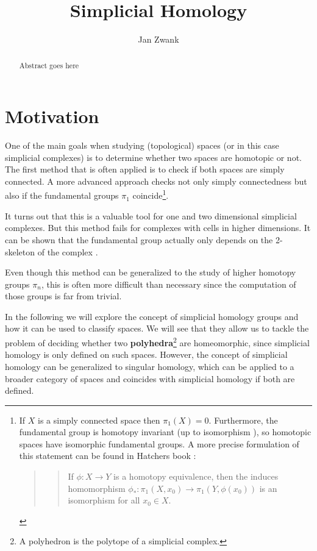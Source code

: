 \documentclass[draft]{scrartcl}
\title{Simplicial Homology}
\author{Jan Zwank}
\theoremstyle{plain}
\theoremstyle{definition}
\theoremstyle{remark}
\newcommand{\sh}{simplicial homology}
\newcommand{\scs}{simplicial complexes}
\begin{document}
	\maketitle
	
	\begin{abstract}
		Abstract goes here
	\end{abstract}
\tableofcontents

\clearpage

\section{Motivation}
One of the main goals when studying (topological) spaces (or in this case \scs) is to determine whether two spaces are homotopic
 or not. The first method that is often applied is to check if both spaces are simply connected. A more advanced approach checks not only simply connectedness but also if the fundamental groups $\pi_1$ coincide\footnote{If $X$ is a simply connected space then $\pi_1(X)=0$. Furthermore, the fundamental group is homotopy invariant (up to isomorphism 
	), so homotopic spaces have isomorphic fundamental groups. A more precise formulation of this statement can be found in Hatchers book \parencite[Prop. 1.18, p. 37]{ha}:
\begin{quotation}
	\begin{quote}
		If $\phi: X\to Y$ is a homotopy equivalence, then the induces homomorphism $\phi_*:\pi_1(X,x_0)\to\pi_1(Y,\phi(x_0))$ is an isomorphism for all $x_0\in X$.
	\end{quote}
\end{quotation} }.

It turns out that this is a valuable tool for one and two dimensional \scs. But this method fails for complexes with cells in higher dimensions. It can be shown that the fundamental group actually only depends on the 2-skeleton of the complex \cite[vgl.][p. 173]{ar}. 

Even though this method can be generalized to the study of higher homotopy groups $\pi_n$, this is often more difficult than necessary since the computation of those groups is far from trivial.

In the following we will explore the concept of \sh{} groups and how it can be used to classify spaces. We will see that they allow us to tackle the problem of deciding whether two \textbf{polyhedra}\footnote{A polyhedron is the polytope of a simplicial complex.} are homeomorphic, since simplicial homology is only defined on such spaces. However, the concept of \sh{} can be generalized to singular homology, which can be applied to a broader category of spaces and coincides with \sh{} if both are defined.
\end{document}
